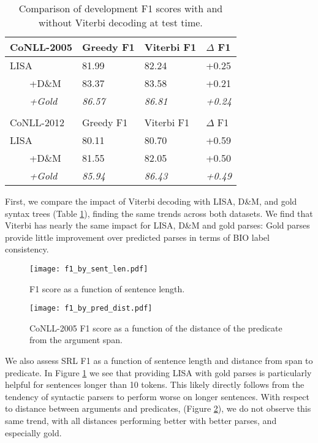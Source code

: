\documentclass[11pt,a4paper]{article}
\begin{document}
\begin{table}
\begin{tabular}{llll}
CoNLL-2005 & Greedy F1 & Viterbi F1 & $\Delta$ F1 \\ \hline \hline
LISA & 81.99 & 82.24 & +0.25 \\
\ \ \ \ +D\&M & 83.37 & 83.58 & +0.21 \\
\ \ \ \ \emph{+Gold} & \emph{86.57} &	\emph{86.81} &	\emph{+0.24} \\
& & & \\
CoNLL-2012 & Greedy F1 & Viterbi F1 & $\Delta$ F1 \\ \hline \hline
LISA & 80.11	& 80.70	 & +0.59 \\
\ \ \ \ +D\&M & 81.55 &	82.05 & +0.50 \\
\ \ \ \ \emph{+Gold} & \emph{85.94} &	\emph{86.43} &	\emph{+0.49} \\
\end{tabular}

\caption{Comparison of development F1 scores with and without Viterbi decoding at test time. \label{viterbi-table}}
\end{table}

First, we compare the impact of Viterbi decoding with LISA, D\&M, and gold syntax trees (Table \ref{viterbi-table}), finding the same trends across both datasets. We find that Viterbi has nearly the same impact for LISA, D\&M and gold parses: Gold parses provide little improvement over predicted parses in terms of BIO label consistency. 

\begin{figure}
\texttt{[image: f1\_by\_sent\_len.pdf]}
\caption{F1 score as a function of sentence length.\label{fig:length}}
\end{figure}

\begin{figure}
\texttt{[image: f1\_by\_pred\_dist.pdf]}
\caption{CoNLL-2005 F1 score as a function of the distance of the predicate from the argument span.\label{fig:dist}}
\end{figure}

We also assess SRL F1 as a function of sentence length and distance from span to predicate. In Figure \ref{fig:length} we see that providing LISA with gold parses is particularly helpful for sentences longer than 10 tokens. This likely directly follows from the tendency of syntactic parsers to perform worse on longer sentences. With respect to distance between arguments and predicates, (Figure \ref{fig:dist}), we do not observe this same trend, with all distances performing better with better parses, and especially gold. 
\end{document}
